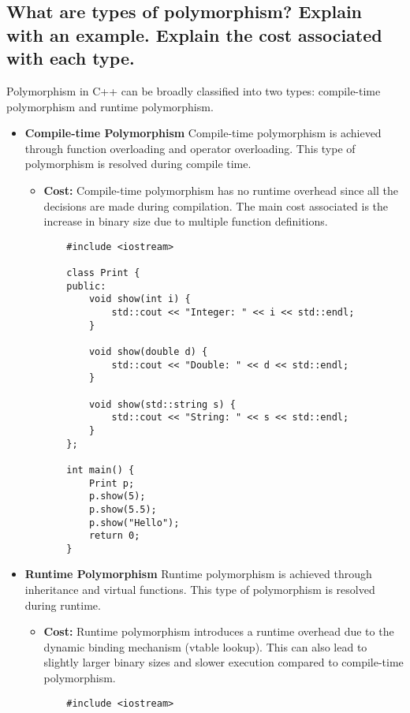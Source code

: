 \subsection{What are types of polymorphism? Explain with an example. Explain the cost associated with each type.}
Polymorphism in C++ can be broadly classified into two types: compile-time polymorphism and runtime polymorphism.
\begin{itemize}
\item \textbf{Compile-time Polymorphism} Compile-time polymorphism is achieved through function overloading and operator overloading. This type of polymorphism is resolved during compile time.
\begin{itemize}
    \item \textbf{Cost:} Compile-time polymorphism has no runtime overhead since all the decisions are made during compilation. The main cost associated is the increase in binary size due to multiple function definitions.
    \begin{tcolorbox}[title=Compile-time Polymorphism using Function Overloading]
    \begin{verbatim}
    #include <iostream>

    class Print {
    public:
        void show(int i) {
            std::cout << "Integer: " << i << std::endl;
        }

        void show(double d) {
            std::cout << "Double: " << d << std::endl;
        }

        void show(std::string s) {
            std::cout << "String: " << s << std::endl;
        }
    };

    int main() {
        Print p;
        p.show(5);
        p.show(5.5);
        p.show("Hello");
        return 0;
    }
    \end{verbatim}
    \end{tcolorbox}
\end{itemize}
\item \textbf{Runtime Polymorphism} Runtime polymorphism is achieved through inheritance and virtual functions. This type of polymorphism is resolved during runtime.
\begin{itemize}
    \item \textbf{Cost:} Runtime polymorphism introduces a runtime overhead due to the dynamic binding mechanism (vtable lookup). This can also lead to slightly larger binary sizes and slower execution compared to compile-time polymorphism.
    \begin{tcolorbox}[title=Runtime Polymorphism using Virtual Functions]
    \begin{verbatim}
    #include <iostream>


\end{verbatim}
\end{tcolorbox}
\end{itemize}
\end{itemize}
